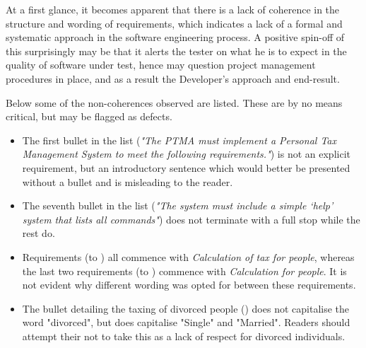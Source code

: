At a first glance, it becomes apparent that there is a lack of coherence in the structure and wording of requirements, which indicates a lack of a formal and systematic approach in the software engineering process.  A positive spin-off of this surprisingly may be that it alerts the tester on what he is to expect in the quality of software under test, hence may question project management procedures in place, and as a result the Developer’s approach and end-result.
\par
Below some of the non-coherences observed are listed. These are by no means critical, but may be flagged as defects.
\begin{itemize}
    \item The first bullet in the list (\textit{"The PTMA must implement a Personal Tax Management System to meet the following requirements."}) is not an explicit requirement, but an introductory sentence which would better be presented without a bullet and is misleading to the reader. 
    \item The seventh bullet in the list (\textit{"The system must include a simple ‘help’ system that lists all commands"}) does not terminate with a full stop while the rest do. 
    \item Requirements (\REightFive \space to \REightTen) all commence with \textit{Calculation of tax for people}, whereas the last two requirements (\REightEleven \space to \REightTwelve) commence with \textit{Calculation for people}. It is not evident why different wording was opted for between these requirements. 
    \item The bullet detailing the taxing of divorced people (\REightSeven) does not capitalise the word "divorced", but does capitalise "Single" and "Married". Readers should attempt their not to take this as a lack of respect for divorced individuals. 
\end{itemize}


